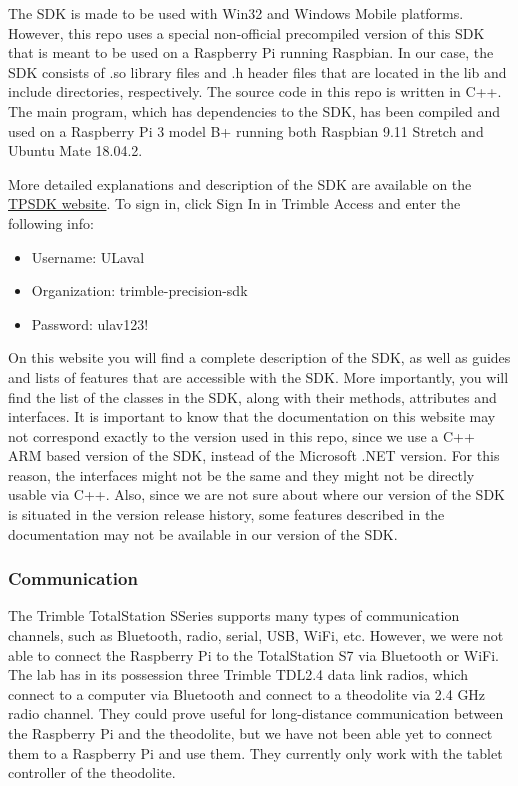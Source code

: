 \documentclass[10pt,letterpaper,oneside]{article}
\begin{document}
The SDK is made to be used with Win32 and Windows Mobile platforms. 
However, this repo uses a special non-official precompiled version of this SDK that is meant to be used on a Raspberry Pi running Raspbian. 
In our case, the SDK consists of .so library files and .h header files that are located in the lib and include directories, respectively. 
The source code in this repo is written in C++. 
The main program, which has dependencies to the SDK, has been compiled and used on a Raspberry Pi 3 model B+ running both Raspbian 9.11 Stretch and Ubuntu Mate 18.04.2.

More detailed explanations and description of the SDK are available on the \href{run:https://www.myconnectedsite.com\/launcher\/?redir=\%2Fsite\%2Ftrimble-precision-sdk\%2FTrimblePrecisionSDK#login}{TPSDK website}. 
To sign in, click Sign In in Trimble Access and enter the following info:

\begin{itemize}
	\item Username: ULaval
    \item Organization: trimble-precision-sdk
    \item Password: ulav123!
\end{itemize}    

On this website you will find a complete description of the SDK, as well as guides and lists of features that are accessible with the SDK. 
More importantly, you will find the list of the classes in the SDK, along with their methods, attributes and interfaces. 
It is important to know that the documentation on this website may not correspond exactly to the version used in this repo, since we use a C++ ARM based version of the SDK, instead of the Microsoft .NET version. 
For this reason, the interfaces might not be the same and they might not be directly usable via C++.
Also, since we are not sure about where our version of the SDK is situated in the version release history, some features described in the documentation may not be available in our version of the SDK.

\subsubsection{Communication}

The Trimble TotalStation SSeries supports many types of communication channels, such as Bluetooth, radio, serial, USB, WiFi, etc. 
However, we were not able to connect the Raspberry Pi to the TotalStation S7 via Bluetooth or WiFi. 
The lab has in its possession three Trimble TDL2.4 data link radios, which connect to a computer via Bluetooth and connect to a theodolite via 2.4 GHz radio channel. 
They could prove useful for long-distance communication between the Raspberry Pi and the theodolite, but we have not been able yet to connect them to a Raspberry Pi and use them. 
They currently only work with the tablet controller of the theodolite.
\end{document}
